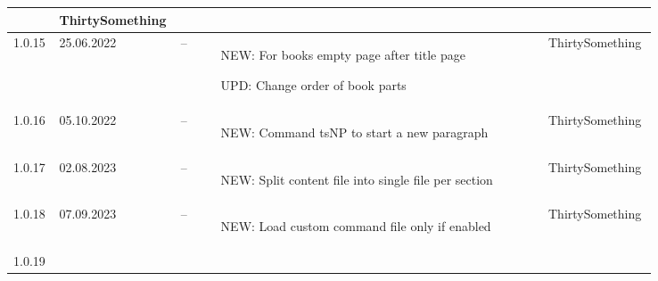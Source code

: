 \begin{tiny}
\begin{longtable}{ | p{0.06\linewidth} | p{0.08\linewidth} | p{0.06\linewidth} | P{0.49\linewidth} | p{0.15\linewidth} | }
\begin{tsLTItemize}
        \end{tsLTItemize}
                                 &
        ThirtySomething            \\
        \hline
        1.0.15                   &
        25.06.2022               &
        --                       &
        \begin{tsLTItemize}
            \item NEW: For books empty page after title page
            \item UPD: Change order of book parts
        \end{tsLTItemize}
                                 &
        ThirtySomething            \\
        \hline
        1.0.16                   &
        05.10.2022               &
        --                       &
        \begin{tsLTItemize}
            \item NEW: Command tsNP to start a new paragraph
        \end{tsLTItemize}
                                 &
        ThirtySomething            \\
        \hline
        1.0.17                   &
        02.08.2023               &
        --                       &
        \begin{tsLTItemize}
            \item NEW: Split content file into single file per section
        \end{tsLTItemize}
                                 &
        ThirtySomething            \\
        \hline
        1.0.18                   &
        07.09.2023               &
        --                       &
        \begin{tsLTItemize}
            \item NEW: Load custom command file only if enabled
        \end{tsLTItemize}
                                 &
        ThirtySomething            \\
        \hline
        1.0.19                   &

\end{longtable}
\end{tiny}

